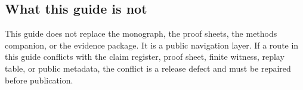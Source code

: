 \subsection{What this guide is not}

This guide does not replace the monograph, the proof sheets, the methods
companion, or the evidence package. It is a public navigation layer. If a route
in this guide conflicts with the claim register, proof sheet, finite witness,
replay table, or public metadata, the conflict is a release defect and must be
repaired before publication.
